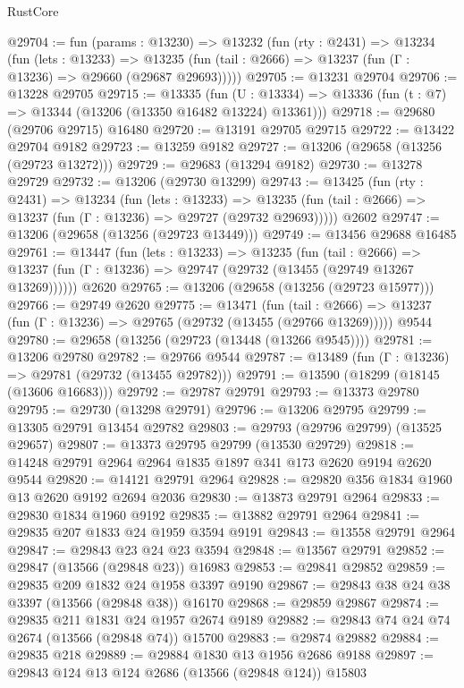 \begin{lexlean}{RustCore}
\begin{coremodule}
@29704 := fun (params : @13230) =>
  @13232
    (fun (rty : @2431) =>
    @13234
      (fun (lets : @13233) =>
      @13235 (fun (tail : @2666) => @13237 (fun (Γ : @13236) => @29660 (@29687 @29693)))))
@29705 := @13231 @29704
@29706 := @13228 @29705
@29715 := @13335
    (fun (U : @13334) => @13336 (fun (t : @7) => @13344 (@13206 (@13350 @16482 @13224) @13361)))
@29718 := @29680 (@29706 @29715) @16480
@29720 := @13191 @29705 @29715
@29722 := @13422 @29704 @9182
@29723 := @13259 @9182
@29727 := @13206 (@29658 (@13256 (@29723 @13272)))
@29729 := @29683 (@13294 @9182)
@29730 := @13278 @29729
@29732 := @13206 (@29730 @13299)
@29743 := @13425
    (fun (rty : @2431) =>
    @13234
      (fun (lets : @13233) =>
      @13235 (fun (tail : @2666) => @13237 (fun (Γ : @13236) => @29727 (@29732 @29693)))))
    @2602
@29747 := @13206 (@29658 (@13256 (@29723 @13449)))
@29749 := @13456 @29688 @16485
@29761 := @13447
    (fun (lets : @13233) =>
    @13235
      (fun (tail : @2666) =>
      @13237 (fun (Γ : @13236) => @29747 (@29732 (@13455 (@29749 @13267 @13269))))))
    @2620
@29765 := @13206 (@29658 (@13256 (@29723 @15977)))
@29766 := @29749 @2620
@29775 := @13471
    (fun (tail : @2666) => @13237 (fun (Γ : @13236) => @29765 (@29732 (@13455 (@29766 @13269)))))
    @9544
@29780 := @29658 (@13256 (@29723 (@13448 (@13266 @9545))))
@29781 := @13206 @29780
@29782 := @29766 @9544
@29787 := @13489 (fun (Γ : @13236) => @29781 (@29732 (@13455 @29782)))
@29791 := @13590 (@18299 (@18145 (@13606 @16683)))
@29792 := @29787 @29791
@29793 := @13373 @29780
@29795 := @29730 (@13298 @29791)
@29796 := @13206 @29795
@29799 := @13305 @29791 @13454 @29782
@29803 := @29793 (@29796 @29799) (@13525 @29657)
@29807 := @13373 @29795 @29799 (@13530 @29729)
@29818 := @14248 @29791 @2964 @2964 @1835 @1897 @341 @173 @2620 @9194 @2620 @9544
@29820 := @14121 @29791 @2964
@29828 := @29820 @356 @1834 @1960 @13 @2620 @9192 @2694 @2036
@29830 := @13873 @29791 @2964
@29833 := @29830 @1834 @1960 @9192
@29835 := @13882 @29791 @2964
@29841 := @29835 @207 @1833 @24 @1959 @3594 @9191
@29843 := @13558 @29791 @2964
@29847 := @29843 @23 @24 @23 @3594
@29848 := @13567 @29791
@29852 := @29847 (@13566 (@29848 @23)) @16983
@29853 := @29841 @29852
@29859 := @29835 @209 @1832 @24 @1958 @3397 @9190
@29867 := @29843 @38 @24 @38 @3397 (@13566 (@29848 @38)) @16170
@29868 := @29859 @29867
@29874 := @29835 @211 @1831 @24 @1957 @2674 @9189
@29882 := @29843 @74 @24 @74 @2674 (@13566 (@29848 @74)) @15700
@29883 := @29874 @29882
@29884 := @29835 @218
@29889 := @29884 @1830 @13 @1956 @2686 @9188
@29897 := @29843 @124 @13 @124 @2686 (@13566 (@29848 @124)) @15803

\end{coremodule}
\end{lexlean}

